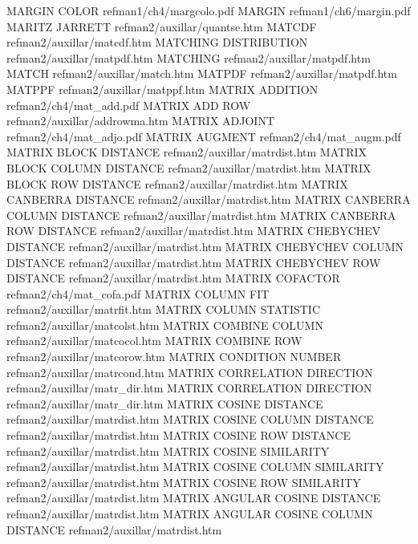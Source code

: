MARGIN COLOR                            refman1/ch4/margcolo.pdf
MARGIN                                  refman1/ch6/margin.pdf
MARITZ JARRETT                          refman2/auxillar/quantse.htm
MATCDF                                  refman2/auxillar/matcdf.htm
MATCHING DISTRIBUTION                   refman2/auxillar/matpdf.htm
MATCHING                                refman2/auxillar/matpdf.htm
MATCH                                   refman2/auxillar/match.htm
MATPDF                                  refman2/auxillar/matpdf.htm
MATPPF                                  refman2/auxillar/matppf.htm
MATRIX ADDITION                         refman2/ch4/mat_add.pdf
MATRIX ADD ROW                          refman2/auxillar/addrowma.htm
MATRIX ADJOINT                          refman2/ch4/mat_adjo.pdf
MATRIX AUGMENT                          refman2/ch4/mat_augm.pdf
MATRIX BLOCK DISTANCE                   refman2/auxillar/matrdist.htm
MATRIX BLOCK COLUMN DISTANCE            refman2/auxillar/matrdist.htm
MATRIX BLOCK ROW DISTANCE               refman2/auxillar/matrdist.htm
MATRIX CANBERRA DISTANCE                refman2/auxillar/matrdist.htm
MATRIX CANBERRA COLUMN DISTANCE         refman2/auxillar/matrdist.htm
MATRIX CANBERRA ROW DISTANCE            refman2/auxillar/matrdist.htm
MATRIX CHEBYCHEV DISTANCE               refman2/auxillar/matrdist.htm
MATRIX CHEBYCHEV COLUMN DISTANCE        refman2/auxillar/matrdist.htm
MATRIX CHEBYCHEV ROW DISTANCE           refman2/auxillar/matrdist.htm
MATRIX COFACTOR                         refman2/ch4/mat_cofa.pdf
MATRIX COLUMN FIT                       refman2/auxillar/matrfit.htm
MATRIX COLUMN STATISTIC                 refman2/auxillar/matcolst.htm
MATRIX COMBINE COLUMN                   refman2/auxillar/matcocol.htm
MATRIX COMBINE ROW                      refman2/auxillar/matcorow.htm
MATRIX CONDITION NUMBER                 refman2/auxillar/matrcond.htm
MATRIX CORRELATION DIRECTION            refman2/auxillar/matr_dir.htm
MATRIX CORRELATION DIRECTION            refman2/auxillar/matr_dir.htm
MATRIX COSINE DISTANCE                  refman2/auxillar/matrdist.htm
MATRIX COSINE COLUMN DISTANCE           refman2/auxillar/matrdist.htm
MATRIX COSINE ROW DISTANCE              refman2/auxillar/matrdist.htm
MATRIX COSINE SIMILARITY                refman2/auxillar/matrdist.htm
MATRIX COSINE COLUMN SIMILARITY         refman2/auxillar/matrdist.htm
MATRIX COSINE ROW SIMILARITY            refman2/auxillar/matrdist.htm
MATRIX ANGULAR COSINE DISTANCE          refman2/auxillar/matrdist.htm
MATRIX ANGULAR COSINE COLUMN DISTANCE   refman2/auxillar/matrdist.htm
